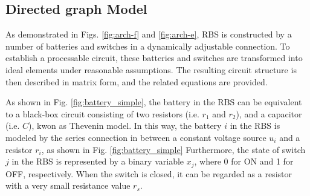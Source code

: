 \documentclass{article}
\begin{document}
\subsection{Directed graph Model}

As demonstrated in Figs. \ref{fig:arch-f} and \ref{fig:arch-e}, RBS is constructed by a number of batteries and switches in a dynamically adjustable connection.
To establish a processable circuit, these batteries and switches are transformed into ideal elements under reasonable assumptions.
The resulting circuit structure is then described in matrix form, and the related equations are provided.


As shown in Fig. \ref{fig:battery_simple}, the battery in the RBS can be equivalent to a black-box circuit consisting of two resistors (i.e. $r_1$ and $r_2$), and a capacitor (i.e. $C$), kwon as Thevenin model\cite{hongwenheStateofChargeEstimationLithiumIon2011,mousavig.VariousBatteryModels2014}. %
In this way, the battery $i$ in the RBS is modeled by the series connection in between a constant voltage source $u_{i}$ and a resistor $r_{i}$,  as shown in Fig. \ref{fig:battery_simple}
Furthermore, the state of switch $j$ in the RBS is represented by a binary variable $x_j$, where 0 for ON and 1 for OFF, respectively.
When the switch is closed, it can be regarded as a resistor with a very small resistance value $r_s$.
\end{document}
